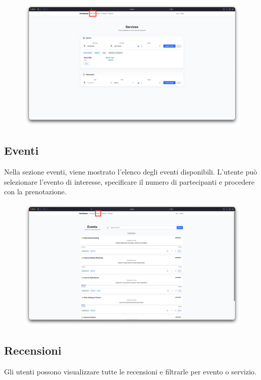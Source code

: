 \documentclass[a4paper,12pt]{report}
\begin{document}
\begin{figure}[H]
    \centering
    \includegraphics[width=\textwidth, trim=0 0 0 0]{./img/users/services.png}
    \vspace{-1em}
    \label{fig:services}
\end{figure}

\subsection*{Eventi}
Nella sezione eventi, viene mostrato l'elenco degli eventi disponibili. L'utente può selezionare 
l'evento di interesse, specificare il numero di partecipanti e procedere con la prenotazione. 

\begin{figure}[H]
    \centering
    \includegraphics[width=\textwidth, trim=0 0 0 0]{./img/users/events.png}
    \vspace{-1em}
    \label{fig:events}
\end{figure}

\subsection*{Recensioni}
Gli utenti possono visualizzare tutte le recensioni e filtrarle per evento o servizio.
\end{document}
